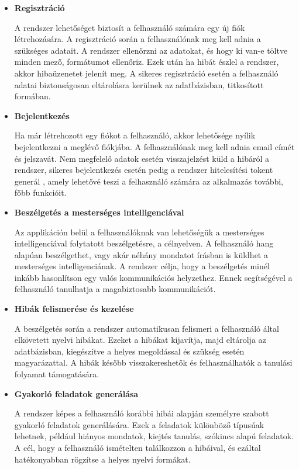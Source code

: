 \begin{itemize}
    \item \textbf{Regisztráció}

    A rendszer lehetőséget biztosít a felhasználó számára egy új fiók létrehozására. A regisztráció során a felhasználónak meg kell adnia a szükséges adatait. A rendszer ellenőrzni az adatokat, és hogy ki van-e töltve minden mező, formátumot ellenőriz. Ezek után ha hibát észlel a rendszer, akkor hibaüzenetet jelenít meg. A sikeres regisztráció esetén a felhasználó adatai biztonságosan eltárolásra kerülnek az adatbázisban, titkosított formában.\cite{owaspPasswordStorage}

    \item \textbf{Bejelentkezés}

    Ha már létrehozott egy fiókot a felhasználó, akkor lehetősége nyílik bejelentkezni a meglévő fiókjába. A felhasználónak meg kell adnia email címét és jelszavát. Nem megfelelő adatok esetén visszajelzést küld a hibáról a rendszer, sikeres bejelentkezés esetén pedig a rendszer hitelesítési tokent generál \cite{jwt}, amely lehetővé teszi a felhasználó számára az alkalmazás további, főbb funkcióit.

    \item \textbf{Beszélgetés a mesterséges intelligenciával}

    Az applikáción belül a felhasználóknak van lehetőségük a mesterséges intelligenciával folytatott beszélgetésre, a célnyelven. A felhasználó hang alapúan beszélgethet, vagy akár néhány mondatot írásban is küldhet a mesterséges intelligenciának. A rendszer célja, hogy a beszélgetés minél inkább hasonlítson egy valós kommunikációs helyzethez. Ennek segítségével a felhasználó tanulhatja a magabiztosabb kommunikációt.

    \item \textbf{Hibák felismerése és kezelése}

    A beszélgetés során a rendszer automatikusan felismeri a felhasználó által elkövetett nyelvi hibákat. Ezeket a hibákat kijavítja, majd eltárolja az adatbázisban, kiegészítve a helyes megoldással és szükség esetén magyarázattal. A hibák később visszakereshetők és felhasználhatók a tanulási folyamat támogatására.

    \item \textbf{Gyakorló feladatok generálása}

    A rendszer képes a felhasználó korábbi hibái alapján személyre szabott gyakorló feladatok generálására. Ezek a feladatok különböző típusúak lehetnek, például hiányos mondatok, kiejtés tanulás, szókincs alapú feladatok. A cél, hogy a felhasználó ismételten találkozzon a hibáival, és ezáltal hatékonyabban rögzítse a helyes nyelvi formákat.


\end{itemize}
